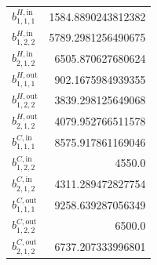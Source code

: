 \documentclass{article}%
\begin{document}
\begin{multicols*}{3}
\begin{supertabular}{lr}
	$b_{1,1,1}^{H,\text{in}}$ & 1584.8890243812382 \\%
	$b_{1,2,2}^{H,\text{in}}$ & 5789.2981256490675 \\%
	$b_{2,1,2}^{H,\text{in}}$ & 6505.870627680624 \\%
	$b_{1,1,1}^{H,\text{out}}$ & 902.1675984939355 \\%
	$b_{1,2,2}^{H,\text{out}}$ & 3839.298125649068 \\%
	$b_{2,1,2}^{H,\text{out}}$ & 4079.952766511578 \\%
	$b_{1,1,1}^{C,\text{in}}$ & 8575.917861169046 \\%
	$b_{1,2,2}^{C,\text{in}}$ & 4550.0 \\%
	$b_{2,1,2}^{C,\text{in}}$ & 4311.289472827754 \\%
	$b_{1,1,1}^{C,\text{out}}$ & 9258.639287056349 \\%
	$b_{1,2,2}^{C,\text{out}}$ & 6500.0 \\%
	$b_{2,1,2}^{C,\text{out}}$ & 6737.207333996801 \\%
\end{supertabular}%
\end{multicols*}%
\clearpage%
\end{document}
